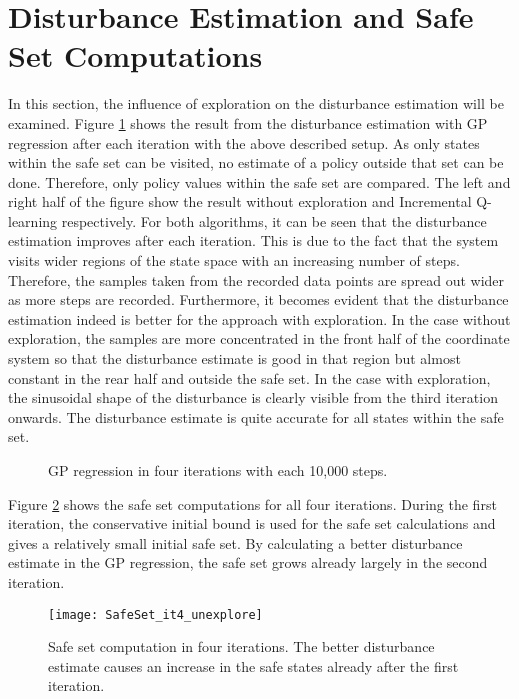 \documentclass[../main.tex]{subfiles}
\begin{document}
\section{Disturbance Estimation and Safe Set Computations}
In this section, the influence of exploration on the disturbance estimation will be examined. Figure \ref{fig:GP_it4_doubleexplore} shows the result from the disturbance estimation with GP regression after each iteration with the above described setup. As only states within the safe set can be visited, no estimate of a policy outside that set can be done. Therefore, only policy values within the safe set are compared. The left and right half of the figure show the result without exploration and Incremental Q-learning respectively. For both algorithms, it can be seen that the disturbance estimation improves after each iteration. This is due to the fact that the system visits wider regions of the state space with an increasing number of steps. Therefore, the samples taken from the recorded data points are spread out wider as more steps are recorded. Furthermore, it becomes evident that the disturbance estimation indeed is better for the approach with exploration. In the case without exploration, the samples are more concentrated in the front half of the coordinate system so that the disturbance estimate is good in that region but almost constant in the rear half and outside the safe set. In the case with exploration, the sinusoidal shape of the disturbance is clearly visible from the third iteration onwards. The disturbance estimate is quite accurate for all states within the safe set. 

\begin{figure}[H]
    \centering
        \caption{GP regression in four iterations with each 10,000 steps.}  \label{fig:GP_it4_doubleexplore}
\end{figure}


Figure \ref{fig:SafeSet_it4_unexplore} shows the safe set computations for all four iterations. During the first iteration, the conservative initial bound is used for the safe set calculations and gives a relatively small initial safe set. By calculating a better disturbance estimate in the GP regression, the safe set grows already largely in the second iteration. 
\begin{figure}[H]
    \centering
    \texttt{[image: SafeSet\_it4\_unexplore]}
        \caption{Safe set computation in four iterations. The better disturbance estimate causes an increase in the safe states already after the first iteration.}  \label{fig:SafeSet_it4_unexplore}
\end{figure}
\end{document}
